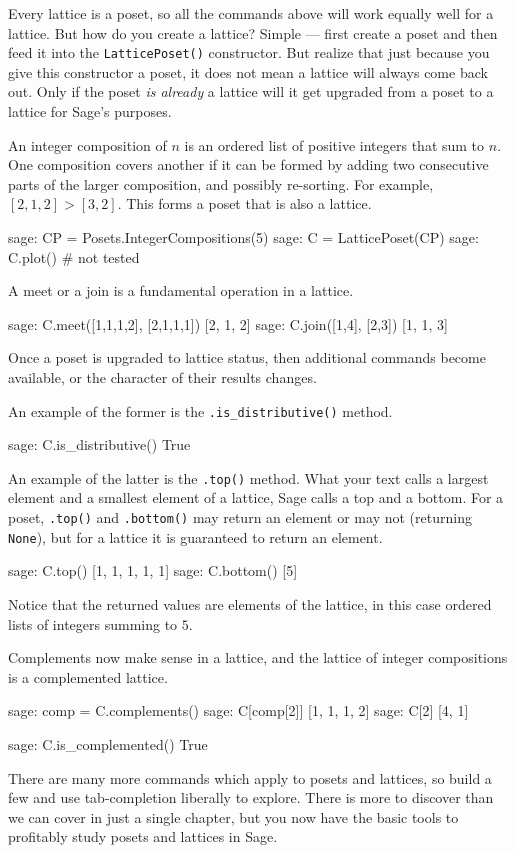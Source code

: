 %
%
Every lattice is a poset, so all the commands above will work equally well for a lattice.  But how do you create a lattice?  Simple --- first create a poset and then feed it into the \verb?LatticePoset()? constructor.  But realize that just because you give this constructor a poset, it does not mean a lattice will always come back out.  Only if the poset \emph{is already} a lattice will it get upgraded from a poset to a lattice for Sage's purposes.\par
%
An integer composition of $n$ is an ordered list of positive integers that sum to $n$.  One composition covers another if it can be formed by adding two consecutive parts of the larger composition, and possibly re-sorting.  For example, $[2, 1, 2] > [3, 2]$.  This forms a poset that is also a lattice.
%
\begin{sageexample}
sage: CP = Posets.IntegerCompositions(5)
sage: C = LatticePoset(CP)
sage: C.plot()    # not tested
\end{sageexample}
%
A meet or a join is a fundamental operation in a lattice.
%
\begin{sageexample}
sage: C.meet([1,1,1,2], [2,1,1,1])
[2, 1, 2]
sage: C.join([1,4], [2,3])
[1, 1, 3]
\end{sageexample}
%
Once a poset is upgraded to lattice status, then additional commands become available, or the character of their results changes.\par
%
An example of the former is the \verb?.is_distributive()?  method.
%
\begin{sageexample}
sage: C.is_distributive()
True
\end{sageexample}
%
An example of the latter is the \verb?.top()?  method.  What your text calls a largest element and a smallest element of a lattice, Sage calls a top and a bottom.  For a poset, \verb?.top()? and \verb?.bottom()? may return an element or may not (returning \verb?None?), but for a lattice it is guaranteed to return an element.
%
\begin{sageexample}
sage: C.top()
[1, 1, 1, 1, 1]
sage: C.bottom()
[5]
\end{sageexample}
%
Notice that the returned values are elements of the lattice, in this case ordered lists of integers summing to $5$.\par
%
Complements now make sense in a lattice, and the lattice of integer compositions is a complemented lattice.
%
\begin{sageexample}
sage: comp = C.complements()
sage: C[comp[2]]
[1, 1, 1, 2]
sage: C[2]
[4, 1]
\end{sageexample}
%
\begin{sageexample}
sage: C.is_complemented()
True
\end{sageexample}
%
There are many more commands which apply to posets and lattices, so build a few and use tab-completion liberally to explore.  There is more to discover than we can cover in just a single chapter, but you now have the basic tools to profitably study posets and lattices in Sage.
%
